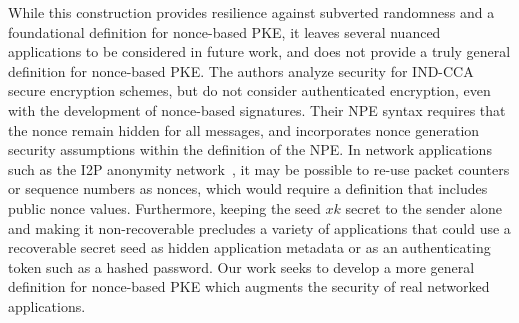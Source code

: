 While this construction provides resilience against subverted randomness and a foundational definition for nonce-based PKE,
it leaves several nuanced applications to be considered in future work, and does not provide a truly general definition for nonce-based PKE.
The authors analyze security for IND-CCA secure encryption schemes, but do not consider authenticated encryption, even
with the development of nonce-based signatures.  Their NPE syntax requires that the nonce remain hidden for all messages,
and incorporates nonce generation security assumptions within the definition of the NPE.  In network applications such as 
the I2P anonymity network~\cite{zantout2011}, it may be possible to re-use packet counters or sequence numbers as nonces, which would
require a definition that includes public nonce values.  Furthermore, keeping the seed $xk$ secret to the sender alone and
making it non-recoverable precludes a variety of applications that could use a recoverable secret
seed as hidden application metadata or as an authenticating token such as a hashed password.  Our work seeks to develop a more general
definition for nonce-based PKE which augments the security of real networked applications.

